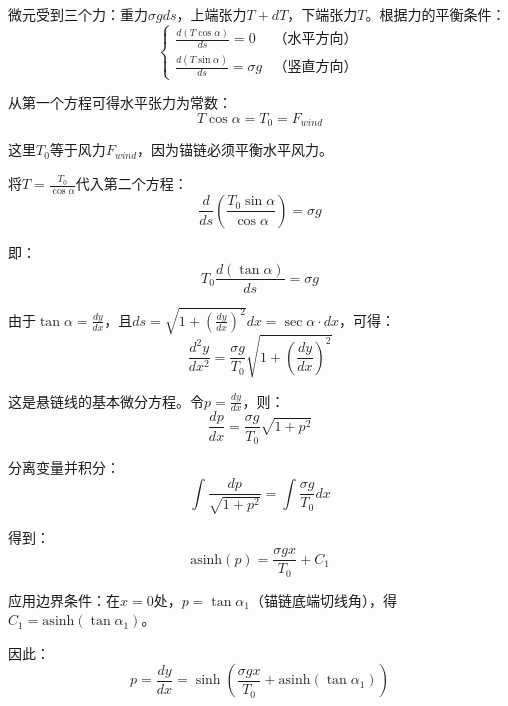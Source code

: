 \documentclass[withoutpreface,bwprint]{cumcmthesis}
\begin{document}
微元受到三个力：重力$\sigma g ds$，上端张力$T+dT$，下端张力$T$。根据力的平衡条件：
\begin{equation}
\begin{cases}
\frac{d(T\cos\alpha)}{ds} = 0 & \text{（水平方向）} \\
\frac{d(T\sin\alpha)}{ds} = \sigma g & \text{（竖直方向）}
\end{cases}
\end{equation}

从第一个方程可得水平张力为常数：
\begin{equation}
T\cos\alpha = T_0 = F_{wind}
\end{equation}

这里$T_0$等于风力$F_{wind}$，因为锚链必须平衡水平风力。

将$T = \frac{T_0}{\cos\alpha}$代入第二个方程：
\begin{equation}
\frac{d}{ds}\left(\frac{T_0\sin\alpha}{\cos\alpha}\right) = \sigma g
\end{equation}

即：
\begin{equation}
T_0\frac{d(\tan\alpha)}{ds} = \sigma g
\end{equation}

由于$\tan\alpha = \frac{dy}{dx}$，且$ds = \sqrt{1+(\frac{dy}{dx})^2}dx = \sec\alpha \cdot dx$，可得：
\begin{equation}
\frac{d^2y}{dx^2} = \frac{\sigma g}{T_0}\sqrt{1+\left(\frac{dy}{dx}\right)^2}
\end{equation}

这是悬链线的基本微分方程。令$p = \frac{dy}{dx}$，则：
\begin{equation}
\frac{dp}{dx} = \frac{\sigma g}{T_0}\sqrt{1+p^2}
\end{equation}

分离变量并积分：
\begin{equation}
\int \frac{dp}{\sqrt{1+p^2}} = \int \frac{\sigma g}{T_0}dx
\end{equation}

得到：
\begin{equation}
\text{asinh}(p) = \frac{\sigma g x}{T_0} + C_1
\end{equation}

应用边界条件：在$x=0$处，$p = \tan\alpha_1$（锚链底端切线角），得$C_1 = \text{asinh}(\tan\alpha_1)$。

因此：
\begin{equation}
p = \frac{dy}{dx} = \sinh\left(\frac{\sigma g x}{T_0} + \text{asinh}(\tan\alpha_1)\right)
\end{equation}
\end{document}
